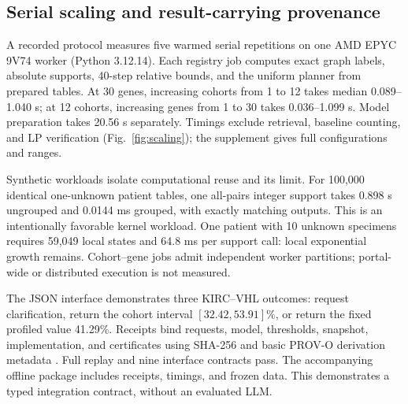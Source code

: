 \subsection{Serial scaling and result-carrying provenance}
A recorded protocol measures five warmed serial repetitions on one AMD EPYC 9V74 worker (Python 3.12.14). Each registry job computes exact graph labels, absolute supports, 40-step relative bounds, and the uniform planner from prepared tables. At 30 genes, increasing cohorts from 1 to 12 takes median 0.089--1.040 s; at 12 cohorts, increasing genes from 1 to 30 takes 0.036--1.099 s. Model preparation takes 20.56 s separately. Timings exclude retrieval, baseline counting, and LP verification (Fig.~\ref{fig:scaling}); the supplement gives full configurations and ranges.

Synthetic workloads isolate computational reuse and its limit. For 100,000 identical one-unknown patient tables, one all-pairs integer support takes 0.898 s ungrouped and 0.0144 ms grouped, with exactly matching outputs. This is an intentionally favorable kernel workload. One patient with 10 unknown specimens requires 59,049 local states and 64.8 ms per support call: local exponential growth remains. Cohort--gene jobs admit independent worker partitions; portal-wide or distributed execution is not measured.

The JSON interface demonstrates three KIRC--VHL outcomes: request clarification, return the cohort interval $[32.42,53.91]\%$, or return the fixed profiled value 41.29\%. Receipts bind requests, model, thresholds, snapshot, implementation, and certificates using SHA-256 and basic PROV-O derivation metadata \cite{prov}. Full replay and nine interface contracts pass. The accompanying offline package includes receipts, timings, and frozen data. This demonstrates a typed integration contract, without an evaluated LLM.

